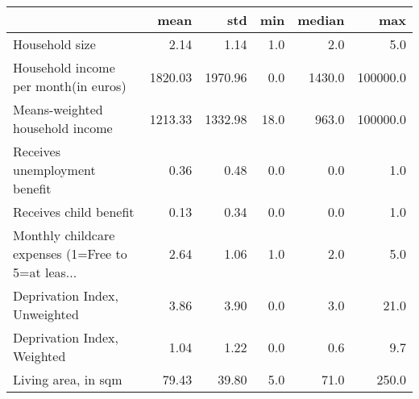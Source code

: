 \begin{tabular}{lrrrrr}
\toprule
{} &     mean &      std &   min &  median &       max \\
\midrule
Household size                                     &     2.14 &     1.14 &   1.0 &     2.0 &       5.0 \\
Household income per month(in euros)               &  1820.03 &  1970.96 &   0.0 &  1430.0 &  100000.0 \\
Means-weighted household income                    &  1213.33 &  1332.98 &  18.0 &   963.0 &  100000.0 \\
Receives unemployment benefit                      &     0.36 &     0.48 &   0.0 &     0.0 &       1.0 \\
Receives child benefit                             &     0.13 &     0.34 &   0.0 &     0.0 &       1.0 \\
Monthly childcare expenses (1=Free to 5=at leas... &     2.64 &     1.06 &   1.0 &     2.0 &       5.0 \\
Deprivation Index, Unweighted                      &     3.86 &     3.90 &   0.0 &     3.0 &      21.0 \\
Deprivation Index, Weighted                        &     1.04 &     1.22 &   0.0 &     0.6 &       9.7 \\
Living area, in sqm                                &    79.43 &    39.80 &   5.0 &    71.0 &     250.0 \\
\bottomrule
\end{tabular}
